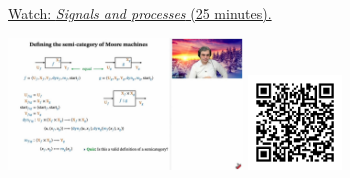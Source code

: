 
\begin{minipage}{10cm}
    \href{https://act4e-spring21.netlify.app/videos/spring2021-actions:semi-actions:processes.html}{Watch: \emph{Signals and processes} (25 minutes).}
        
    \href{https://act4e-spring21.netlify.app/videos/spring2021-actions:semi-actions:processes.html}{\includegraphics[height=3.5cm]{spring2021-actions:semi-actions:processes/thumbnails.jpg}}
    \href{https://act4e-spring21.netlify.app/videos/spring2021-actions:semi-actions:processes.html}{\includegraphics[height=2.5cm]{spring2021-actions:semi-actions:processes/qrcode.png}}
\end{minipage}
